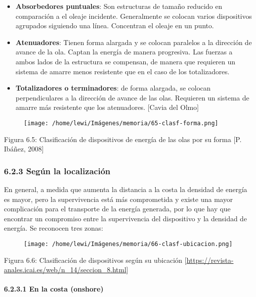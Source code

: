 \documentclass[]{article}
\let\oldparagraph\paragraph
\renewcommand{\paragraph}[1]{\oldparagraph{#1}\mbox{}}
\begin{document}
\begin{itemize}
\item
  \textbf{Absorbedores puntuales}: Son estructuras de tamaño reducido en
  comparación a el oleaje incidente. Generalmente se colocan varios
  dispositivos agrupados siguiendo una línea. Concentran el oleaje en un
  punto. 
\item
  \textbf{Atenuadores}: Tienen forma alargada y se colocan paralelos a
  la dirección de avance de la ola. Captan la energía de manera
  progresiva. Las fuerzas a ambos lados de la estructura se compensan,
  de manera que requieren un sistema de amarre menos resistente que en
  el caso de los totalizadores. 
\item
  \textbf{Totalizadores o terminadores}: de forma alargada, se colocan
  perpendiculares a la dirección de avance de las olas. Requieren un
  sistema de amarre más resistente que los atenuadores. {[}Cavia del
  Olmo{]}
\end{itemize}

\begin{figure}
\centering
\texttt{[image: /home/lewi/Imágenes/memoria/65-clasf-forma.png]}
\caption{}
\end{figure}

Figura 6.5: Clasificación de dispositivos de energía de las olas por su
forma {[}P. Ibáñez, 2008{]}

\subsubsection{6.2.3 Según la localización}\label{header-n123}

En general, a medida que aumenta la distancia a la costa la densidad de
energía es mayor, pero la supervivencia está más comprometida y existe
una mayor complicación para el transporte de la energía generada, por lo
que hay que encontrar un compromiso entre la supervivencia del
dispositivo y la densidad de energía. Se reconocen tres zonas:

\begin{figure}
\centering
\texttt{[image: /home/lewi/Imágenes/memoria/66-clasf-ubicacion.png]}
\caption{}
\end{figure}

Figura 6.6: Clasificación de dispositivos según su ubicación
{[}\url{https://revista-anales.icai.es/web/n_14/seccion_8.html}{]}

\paragraph{6.2.3.1 En la costa (onshore)}\label{header-n130}
\end{document}
